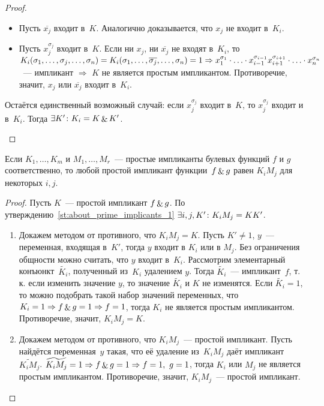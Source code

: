 \begin{proof}
\begin{itemize}
\begin{itemize}
		\item Пусть $\overline{x_j}$ входит в~$K$.
		Аналогично доказывается, что $x_j$ не входит в~$K_i$.
		
		\item Пусть $x_j^{\sigma_j}$ входит в~$K$.
		Если ни $x_j$, ни $\overline{x_j}$ не входят в~$K_i$, то $K_i(\sigma_1, \ldots, \sigma_j, \ldots, \sigma_n) \opbr=
		K_i(\sigma_1, \ldots, \overline{\sigma_j}, \ldots, \sigma_n) = 1 \Rightarrow
		x_1^{\sigma_1} \cdot \ldots \cdot x_{i-1}^{\sigma_{i-1}} x_{i+1}^{\sigma_{i+1}} \cdot \ldots \cdot x_n^{\sigma_n}$~--- импликант $\Rightarrow$ $K$ не является простым импликантом.
		Противоречие, значит, $x_j$ или $\overline{x_j}$ входит в~$K_i$.
	\end{itemize}
	
	Остаётся единственный возможный случай: если $x_j^{\sigma_j}$ входит в~$K$, то $x_j^{\sigma_j}$ входит и в~$K_i$.
	Тогда $\exists K' \colon K_i = K \mathop{\&} K'$.
\end{itemize}
\end{proof}

\begin{statement}
\label{st:prime_implicants_of_conjuction}
Если $K_1, \ldots, K_m$ и $M_1, \ldots, M_r$~--- простые импликанты булевых функций $f$ и $g$ соответственно, то любой простой импликант функции~$f \mathop{\&} g$ равен $K_i M_j$ для некоторых $i, j$.
\end{statement}
\begin{proof}
Пусть $K$~--- простой импликант $f \mathop{\&} g$.
По утверждению~\ref*{st:about_prime_implicants_1} $\exists i, j, K' \colon K_i M_j \opbr= K K'$.
\begin{enumerate}
	\item Докажем методом от противного, что $K_i M_j = K$.
	Пусть $K' \neq 1$, $y$~--- переменная, входящая в~$K'$, тогда $y$ входит в $K_i$ или в $M_j$.
	Без ограничения общности можно считать, что $y$ входит в~$K_i$.
	Рассмотрим элементарный конъюнкт~$\widetilde{K_i}$, полученный из~$K_i$ удалением $y$.
	Тогда $\widetilde{K_i}$~--- импликант~$f$, т.\,к. если изменить значение $y$, то значение $\widetilde{K_i}$ и $K$ не изменятся.
	Если $\widetilde{K_i} = 1$, то можно подобрать такой набор значений переменных, что $K_i = 1 \Rightarrow f \mathop{\&} g = 1 \Rightarrow f = 1$, тогда $K_i$ не является простым импликантом.
	Противоречие, значит, $K_i M_j = K$.
	
	\item Докажем методом от противного, что $K_i M_j$~--- простой импликант.
	Пусть найдётся переменная~$y$ такая, что её удаление из~$K_i M_j$ даёт импликант~$\widetilde{K_i M_j}$.
	$\widetilde{K_i M_j} = 1 \Rightarrow f \mathop{\&} g = 1 \Rightarrow f = 1, \ g = 1$, тогда $K_i$ или $M_j$ не является простым импликантом.
	Противоречие, значит, $K_i M_j$~--- простой импликант.
\end{enumerate}
\end{proof}


